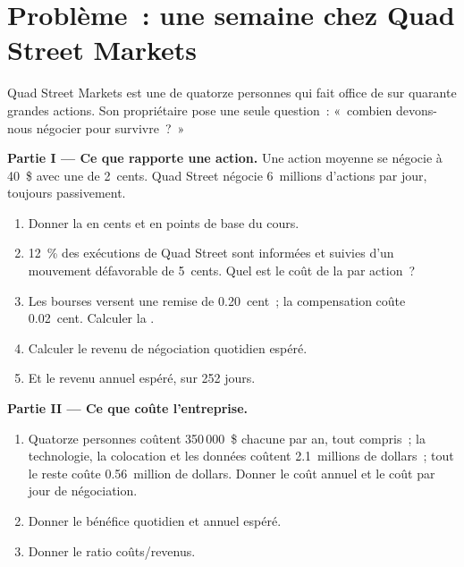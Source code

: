 \section{Problème~: une semaine chez Quad Street Markets}

\begin{problem}\label{pb:m1:what-a-trading-firm-does:1}
Quad Street Markets est une  de quatorze personnes qui fait office de  sur
quarante grandes actions. Son propriétaire pose une seule question~: «~combien devons-nous
négocier pour survivre~?~»

\medskip\noindent\textbf{Partie I --- Ce que rapporte une action.} Une action moyenne
se négocie à 40~\$ avec une  de 2~cents. Quad Street négocie 6~millions d'actions
par jour, toujours passivement.
\begin{enumerate}
\item Donner la  en cents et en points de base du cours.
\item 12~\% des exécutions de Quad Street sont informées et suivies d'un
mouvement défavorable de 5~cents. Quel est le coût de la  par action~?
\item Les bourses versent une remise de 0.20~cent~; la compensation coûte 0.02~cent.
Calculer la .
\item Calculer le revenu de négociation quotidien espéré.
\item Et le revenu annuel espéré, sur 252 jours.
\end{enumerate}

\medskip\noindent\textbf{Partie II --- Ce que coûte l'entreprise.}
\begin{enumerate}[resume]
\item Quatorze personnes coûtent 350\,000~\$ chacune par an, tout compris~; la technologie,
la colocation et les données coûtent 2.1~millions de dollars~; tout le reste coûte 0.56~million de dollars. Donner
le coût annuel et le coût par jour de négociation.
\item Donner le bénéfice quotidien et annuel espéré.
\item Donner le ratio coûts/revenus.
\end{enumerate}


\end{problem}
